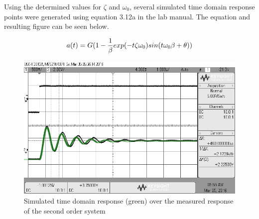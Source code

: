 \pagebreak
Using the determined values for $\zeta$ and $\omega_0$, several simulated time domain response points were generated using equation 3.12a in the lab manual. The equation and resulting figure can be seen below.

\begin{equation}\label{eqn:timedomainresponse}
a(t) = {G(1-{1 \over \beta}exp(-t\zeta\omega_0)sin(t\omega_0\beta + \theta))}
\end{equation} 

\begin{figure}
	\centering
	\includegraphics[width=0.7\linewidth]{graphics/overshoot_simulated}
	\caption{Simulated time domain response (green) over the measured response of the second order system}
	\label{fig:overshoot_sim}
\end{figure}
